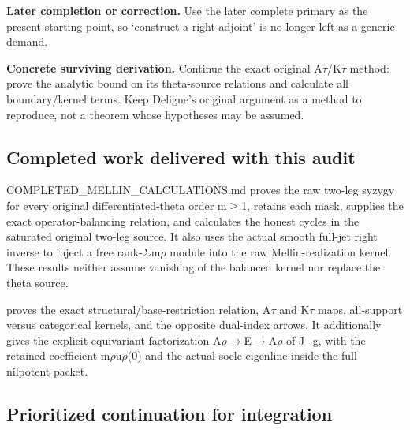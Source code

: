 \textbf{Later completion or correction.} Use the later complete primary
as the present starting point, so `construct a right adjoint' is no
longer left as a generic demand.

\textbf{Concrete surviving derivation.} Continue the exact original
A\allowbreak{}\ensuremath{τ}\allowbreak{}/K\allowbreak{}\ensuremath{τ}\allowbreak{}
method: prove the analytic bound on its theta-source relations and
calculate all boundary/kernel terms. Keep Deligne's original argument as
a method to reproduce, not a theorem whose hypotheses may be assumed.

\subsection{Completed work delivered with this
audit}\label{TranscriptLedgerStage:completed-work-delivered-with-this-audit}

COMPLETED\_MELLIN\_CALCULATIONS.md proves the raw two-leg syzygy for
every original differentiated-theta order
m\allowbreak{}\ensuremath{≥}\allowbreak{}1, retains each mask, supplies
the exact operator-balancing relation, and calculates the honest cycles
in the saturated original two-leg source. It also uses the actual smooth
full-jet right inverse to inject a free
rank-\allowbreak{}\ensuremath{Σ}\allowbreak{}m\allowbreak{}\ensuremath{ρ}\allowbreak{}
module into the raw Mellin-realization kernel. These results neither
assume vanishing of the balanced kernel nor replace the theta source.

\protect{} proves the exact
structural/base-restriction relation,
A\allowbreak{}\ensuremath{τ}\allowbreak{} and
K\allowbreak{}\ensuremath{τ}\allowbreak{} maps, all-support versus
categorical kernels, and the opposite dual-index arrows. It additionally
gives the explicit equivariant factorization
A\allowbreak{}\ensuremath{ρ}\allowbreak{}\allowbreak{}\ensuremath{→}\allowbreak{}E\allowbreak{}\ensuremath{→}\allowbreak{}A\allowbreak{}\ensuremath{ρ}\allowbreak{}
of J\_g, with the retained coefficient
m\allowbreak{}\ensuremath{ρ}\allowbreak{}u\allowbreak{}\ensuremath{ρ}\allowbreak{}(0)
and the actual socle eigenline inside the full nilpotent packet.

\subsection{Prioritized continuation for
integration}\label{TranscriptLedgerStage:prioritized-continuation-for-integration}

